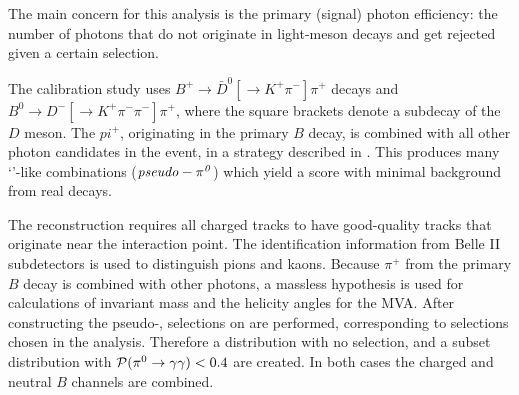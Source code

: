The main concern for this analysis is the primary (signal) photon efficiency: the number of photons that do not originate in light-meson decays and get rejected given a certain \piVeto selection.

The calibration study uses $B^+\to \bar{D}^0[\to K^+\pi^-]\pi^+$ decays and $B^0\to D^-[\to K^+\pi^-\pi^-]\pi^+$, where the square brackets denote a subdecay of the $D$ meson.
The $pi^+$, originating in the primary $B$ decay, is combined with all other photon candidates in the event, in a strategy described in .
This produces many `\piz'-like combinations ($\mathit{pseudo-\pi^0}$) which yield a \piVeto score with minimal background from real \piz decays.

The reconstruction requires all charged tracks to have good-quality tracks that originate near the interaction point.
The identification information from Belle II subdetectors is used to distinguish pions and kaons.
Because $\pi^+$ from the primary $B$ decay is combined with other photons, a massless hypothesis is used for calculations of invariant mass and the helicity angles for the MVA.
After constructing the pseudo-\piz, selections on \piVeto are performed, corresponding to selections chosen in the analysis.
Therefore a distribution with no \piVeto selection, and a subset distribution with ${\mathcal{P}(\pi^0\rightarrow\gamma\gamma)}<0.4$ are created.
In both cases the charged and neutral $B$ channels are combined.

